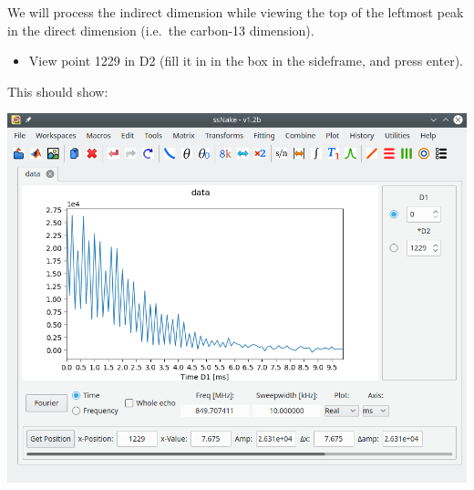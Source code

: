 \documentclass[11pt,a4paper]{article}
\begin{document}
We will process the indirect dimension while viewing the top of the leftmost
peak in the direct dimension (i.e.\ the carbon-13 dimension).

\begin{itemize}
  \item View point 1229 in D2 (fill it in in the box in the sideframe, and
	 press enter).
\end{itemize}
This should show:
\begin{center}
\includegraphics[width=0.8\linewidth]{Figs/Fig1.png}
\end{center}
\end{document}
